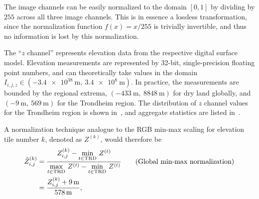 The image channels can be easily normalized to the domain $[0, 1]$ by dividing by $255$ across all three image channels.
This is in essence a lossless transformation, since the normalization function $f(x) = x/255$ is trivially invertible, and thus no information is lost by this normalization.


The \enquote{$z$ channel} represents elevation data from the respective digital surface model.
Elevation measurements are represented by 32-bit, single-precision floating point numbers, and can theoretically take values in the domain $I_{i,j,z} \in (\SI{-3.4e38}{\meter},~\SI{3.4e8}{\meter})$.
In practice, the measurements are bounded by the regional extrema, $(\SI{-433}{\meter},~\SI{8848}{\meter})$ for dry land globally, and $(\SI{-9}{\meter},~\SI{569}{\meter})$ for the Trondheim region.
The distribution of $z$ channel values for the Trondheim region is shown in~, and aggregate statistics are listed in~.

\begin{figure}[htb]
  \begin{floatrow}
  \end{floatrow}
\end{figure}

A normalization technique analogue to the RGB min-max scaling for elevation tile number $k$, denoted as $Z^{(k)}$, would therefore be
\begin{align*}
  \hat{Z}_{i,j}^{(k)}
  &=
  \frac{%
    Z_{i,j}^{(k)} - \underset{t \in \mathrm{TRD}}{\min}~Z^{(t)}
  }{%
    \underset{t \in \mathrm{TRD}}{\max}~Z^{(t)} - \underset{t \in \mathrm{TRD}}{\min}~Z^{(t)}
  }
  \tag{Global min-max normalization}
  \\
  &=
  \frac{%
    Z_{i,j}^{(k)} + \SI{9}{\meter}
  }{%
    \SI{578}{\meter}
  },%
\end{align*}

